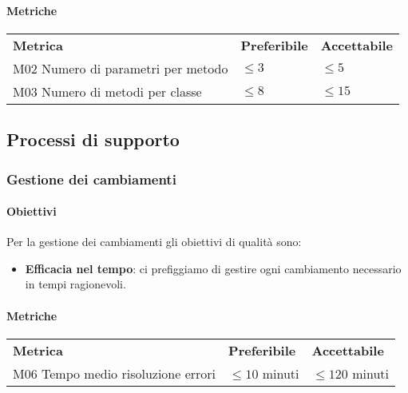 			\paragraph{Metriche} \mbox{}
			\begin{longtable} {
					>{}p{80mm} 
					>{}p{25mm}
					>{}p{25mm}
				}
				\rowcolor{gray!50}
				\textbf{Metrica} & \textbf{Preferibile} & \textbf{Accettabile} \TBstrut \TBstrut \\
				M02 Numero di parametri per metodo & $ \le 3$ & $ \le 5$ \TBstrut \\ [2mm]
				M03 Numero di metodi per classe & $ \le 8$ & $ \le 15$ \TBstrut \\ [2mm]
			\end{longtable}
	
			
	\subsection{Processi di supporto}
		\subsubsection{Gestione dei cambiamenti}
			\paragraph{Obiettivi}
			Per la gestione dei cambiamenti gli obiettivi di qualità sono:
			\begin{itemize}
				\item \textbf{Efficacia nel tempo}: ci prefiggiamo di gestire ogni cambiamento necessario in tempi ragionevoli.
			\end{itemize}
			\paragraph{Metriche} \mbox{}			
			\begin{longtable} {
					>{}p{80mm} 
					>{}p{25mm}
					>{}p{25mm}
				}
				\rowcolor{gray!50}
				\textbf{Metrica} & \textbf{Preferibile} & \textbf{Accettabile} \TBstrut \TBstrut \\
				M06 Tempo medio risoluzione errori & $\le 10$ minuti & $\le 120$ minuti \TBstrut \\ [2mm]
			\end{longtable}			
